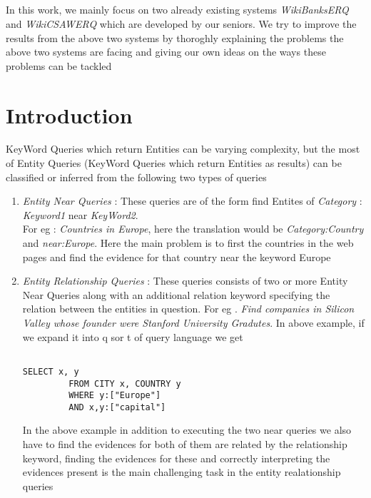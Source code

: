 \documentclass[a4paper,12pt]{report}
\begin{document}
\paragraph*{}
In this work, we mainly focus on two already existing systems \textit{WikiBanksERQ} and \textit{WikiCSAWERQ} which are developed by our seniors. We try to improve the results from the above two systems by thoroghly explaining the problems the above two systems are facing and giving our own ideas on the ways these problems can be tackled


\newpage
\chapter{Introduction}             %
\label{chap:intro}
KeyWord Queries which return Entities can be varying complexity, but the most of Entity Queries (KeyWord Queries which return Entities as results) can be classified or inferred from the following two types of queries
\begin{enumerate}
\item \textit{Entity Near Queries} :  These queries are of the form find Entites of \textit{Category} : \textit{Keyword1} near \textit{KeyWord2}.\\For eg : \textit{Countries in Europe}, here the translation would be \textit {Category:Country} and \textit{near:Europe}. Here the main problem is to first the countries in the web pages and find the evidence for that country near the keyword Europe
          
\item \textit{Entity Relationship Queries} : These queries consists of two or more Entity Near Queries along with an additional relation keyword specifying the relation between the entities in question.
  For eg . \textit{Find companies in Silicon Valley whose founder were Stanford University Gradutes}. In above example, if we expand it into q sor t of query language we get
       \begin{verbatim}                                                                                                                                    SELECT x, y
         FROM CITY x, COUNTRY y
         WHERE y:["Europe"]
         AND x,y:["capital"]
       \end{verbatim}
     In the above example in addition to executing the two near queries we also have to find the evidences for both of them are related by the relationship keyword, finding the evidences for these and correctly interpreting the evidences present is the main challenging task in the entity realationship queries
\end{enumerate}
\end{document}
